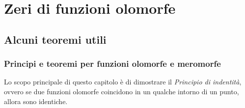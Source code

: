 \def \ord {\operatorname{ord}}

\chapter{Zeri di funzioni olomorfe}
\section{Alcuni teoremi utili}
\subsection{\textcolor{AnComp}{\textbf{Principi e teoremi per funzioni olomorfe e meromorfe}}}

Lo scopo principale di questo capitolo è di dimostrare il \emph{Principio di
indentità}, ovvero se due funzioni olomorfe coincidono in un qualche intorno di
un punto, allora sono identiche.

